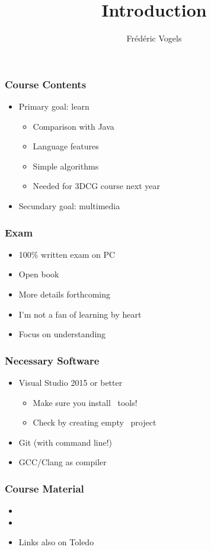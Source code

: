 \documentclass{pvm-slides}
\title{Introduction}
\author{Fr\'ed\'eric Vogels}
\begin{document}
\begin{frame}
  \titlepage
\end{frame}

\begin{frame}
  \frametitle{Course Contents}
  \Large
  \begin{itemize}
    \item Primary goal: learn \cpp
          \begin{itemize}
            \item Comparison with Java
            \item Language features
            \item Simple algorithms
            \item Needed for 3DCG course next year
          \end{itemize}
    \item Secundary goal: multimedia
  \end{itemize}
\end{frame}

\begin{frame}
  \frametitle{Exam}
  \Large
  \begin{itemize}
    \item 100\% written exam on PC
    \item Open book
    \item More details forthcoming
    \item I'm not a fan of learning by heart
    \item Focus on understanding
  \end{itemize}
\end{frame}

\begin{frame}
  \frametitle{Necessary Software}
  \Large
  \begin{itemize}
    \item Visual Studio 2015 or better
          \begin{itemize}
            \item Make sure you install \cpp\ tools!
            \item Check by creating empty \cpp\ project
          \end{itemize}
    \item Git (with command line!)
  \end{itemize}
  \vskip5mm
  \begin{itemize}
    \item GCC/Clang as compiler
  \end{itemize}
\end{frame}

\begin{frame}
  \frametitle{Course Material} \Large
  \begin{itemize}
    \item {}
    \item {}
    \item Links also on Toledo
  \end{itemize}
\end{frame}
\end{document}
